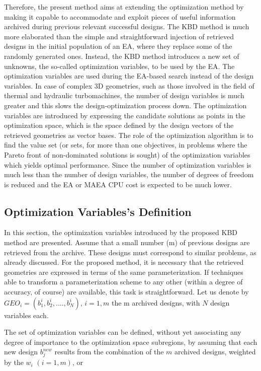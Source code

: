 Therefore, the present method aims at extending the optimization method by making it capable to accommodate and exploit pieces of useful information archived during previous relevant successful designs. The KBD method is much more elaborated than the simple and straightforward injection of retrieved designs in the initial population of an EA, where they replace some of the randomly generated ones. Instead, the KBD method  introduces a new set of unknowns, the so-called optimization variables, to be used by the EA. The optimization variables are used during the EA-based search instead of the design variables. In case of complex 3D geometries, such as those involved in the field of thermal and hydraulic turbomachines, the number of design variables is much greater and this slows the design-optimization process down. The optimization variables are introduced by expressing the candidate solutions as points in the optimization space, which is the space defined by the design vectors of the retrieved geometries as vector bases. The role of the optimization algorithm is to find the value set (or sets, for more than one objectives, in problems where the Pareto front of non-dominated solutions is sought) of the optimization variables which yields optimal performance. Since the number of optimization variables is much less than the number of design variables, the number of degrees of freedom is reduced and the EA or MAEA CPU cost is expected to be much lower.

\subsection{Optimization Variables's Definition}
In this section, the optimization variables introduced by the proposed KBD method are presented. Assume that a small number (m) of previous designs are retrieved from the archive. These designs must correspond to similar problems, as already discussed. For the proposed method, it is necessary  that the retrieved geometries are expressed in terms of the same parameterization. If techniques able to transform a parameterization scheme to any other (within a degree of accuracy, of course) are available, this task is straightforward. Let us denote by $GEO_i=(b_1^i,b_2^i,....,b_N^i)$, $i\!=\!1,m$ the m archived designs, with $N$ design variables each.

The set of optimization variables can be defined, without yet associating any degree of importance to the optimization space subregions, by assuming that each new design $b_j^{new}$ results from the combination of the $m$ archived designs, weighted by the  $w_i$ $(i=1,m)$, or

